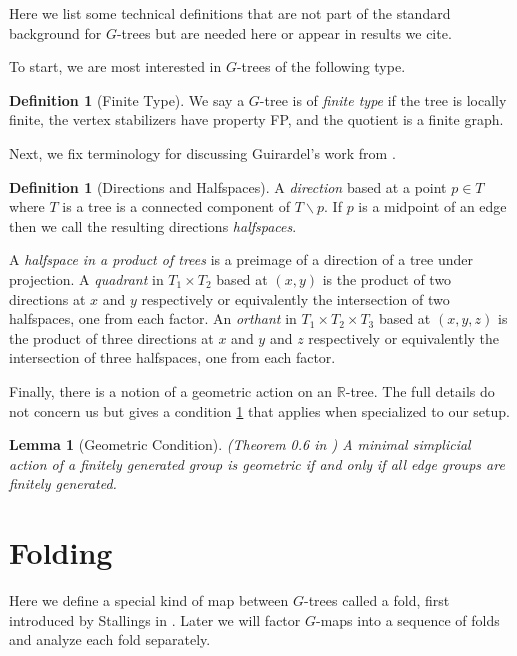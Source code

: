 \documentclass[12pt,parskip=full]{report}
\theoremstyle{plain}
\newtheorem{lem}[thm]{Lemma}
\theoremstyle{definition}
\newtheorem{dfn}[thm]{Definition}
\begin{document}
Here we list some technical definitions that are not part of the standard background for \(G\)-trees but are needed here or appear in results we cite.

To start, we are most interested in \(G\)-trees of the following type.
\begin{dfn}
    [Finite Type]
    \label{defn:finitetype} 
    We say a $G$-tree is of \emph{finite type} if the tree is locally finite, the vertex stabilizers have property FP, and the quotient is a finite graph.
\end{dfn}

Next, we fix terminology for discussing Guirardel's work from \cite{guirardelcorepaper}.

\begin{dfn}
    [Directions and Halfspaces]
    \label{dfn:directionhalfspaces}
    A \emph{direction} based at a point \(p\in T\) where \(T\) is a tree is a connected component of \(T\smallsetminus p\). If \(p\) is a midpoint of an edge then we call the resulting directions \emph{halfspaces}.
    
    A \emph{halfspace in a product of trees} is a preimage of a direction of a tree under projection. A \emph{quadrant} in \(T_1\times T_2\) based at \((x,y)\) is the product of two directions at \(x\) and \(y\) respectively or equivalently the intersection of two halfspaces, one from each factor. An \emph{orthant} in \(T_1\times T_2\times T_3\) based at \((x,y,z)\) is the product of three directions at \(x\) and \(y\) and \(z\) respectively or equivalently the intersection of three halfspaces, one from each factor.
\end{dfn}
 
 Finally, there is a notion of a geometric action on an \(\mathbb{R}\)-tree. The full details do not concern us but \cite{levitt} gives a condition \ref{lem:simpgeo} that applies when specialized to our setup.
 
\begin{lem}
    [Geometric Condition]
    \label{lem:simpgeo} 
    (Theorem 0.6 in \cite{levitt})
    A minimal simplicial action of a finitely generated group is geometric if and only if all edge groups are finitely generated.
\end{lem}

\section{Folding} 

Here we define a special kind of map between \(G\)-trees called a fold, first introduced by Stallings in \cite{stallingsfolds}. Later we will factor \(G\)-maps into a sequence of folds and analyze each fold separately.
\end{document}
